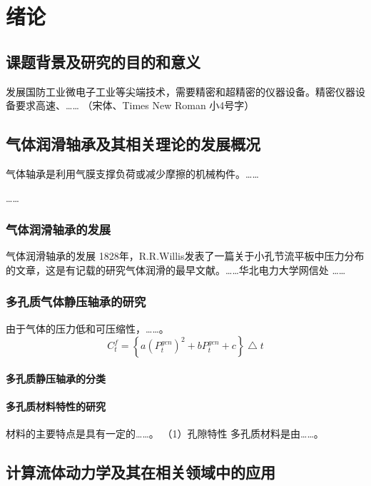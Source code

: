 \setcounter{page}{1} %

\chapter{绪论} %

\section{课题背景及研究的目的和意义} %


发展国防工业微电子工业等尖端技术，需要精密和超精密的仪器设备。精密仪器设备要求高速、…… （宋体、Times New Roman 小4号字）

\section{气体润滑轴承及其相关理论的发展概况} %
气体轴承是利用气膜支撑负荷或减少摩擦的机械构件。……

…… 
\subsection{气体润滑轴承的发展} %

气体润滑轴承的发展
1828年，R.R.Willis发表了一篇关于小孔节流平板中压力分布的文章，这是有记载的研究气体润滑的最早文献。……华北电力大学网信处
…… 
\subsection{多孔质气体静压轴承的研究}
由于气体的压力低和可压缩性，……。
\begin{equation}
\label{gt1}
 C^f_t=\left \{a(P_t^{gen})^2 + b P_t^{gen}+c\right \} \bigtriangleup t
\end{equation}
\subsubsection{多孔质静压轴承的分类}


\subsubsection{多孔质材料特性的研究}
材料的主要特点是具有一定的……。
（1）孔隙特性 多孔质材料是由……。



\section{计算流体动力学及其在相关领域中的应用}
